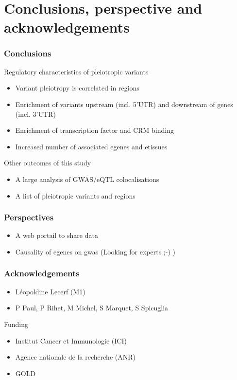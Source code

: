 \documentclass{beamer}
\begin{document}
\let\thefootnote\relax{}

\section{Conclusions, perspective and acknowledgements} %

\begin{frame}
\frametitle{Conclusions}

Regulatory characteristics of pleiotropic variants
%
\begin{itemize}
\item Variant pleiotropy is correlated in regions
\item Enrichment of variants upstream (incl. 5'UTR) and downstream of genes (incl. 3'UTR)
\item Enrichment of transcription factor and CRM binding
\item Increased number of associated egenes and etissues
\end{itemize}
%
\vfill
%
Other outcomes of this study
%
\begin{itemize}
\item A large analysis of GWAS/eQTL colocalisations
\item A list of pleiotropic variants and regions
\end{itemize}

\end{frame}

\begin{frame}
\frametitle{Perspectives}


\begin{itemize}
\item A web portail to share data
\item Causality of egenes on gwas (Looking for experts ;-) )
\end{itemize}

\end{frame}

\begin{frame}
\frametitle{Acknowledgements}

\begin{itemize}
\item L\'eopoldine Lecerf (M1)
\item P Paul, P Rihet, M Michel, S Marquet, S Spicuglia
\end{itemize}
%
\vfill
%
Funding
%
\begin{itemize}
\item Institut Cancer et Immunologie (ICI)
\item Agence nationale de la recherche (ANR)
\item GOLD
\end{itemize}

\end{frame}
\end{document}

